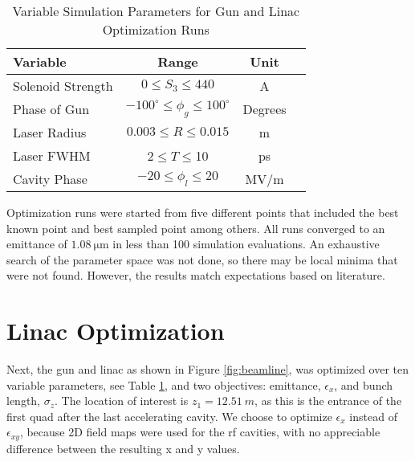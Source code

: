 \documentclass[letterpaper,  %
              ]{jacow}
\begin{document}
\begin{table}[hbt] %
	\centering
	\begin{tabular}{ l *{3}{c}}
		\textbf{Variable} & \textbf{Range} & \textbf{Unit} \\
		\hline %
		Solenoid Strength & $ 0 \le S_3 \le 440$  & A \\
		Phase of Gun & $-100^\circ \le \phi_g \le 100^\circ$  & Degrees \\
		Laser Radius & $0.003 \le R \le 0.015$  & m \\
		Laser FWHM & $2 \le T \le $10  & ps \\
		Cavity Phase & $-20 \le \phi_l \le 20$  & MV/m \\
	\end{tabular}
	\caption{Variable Simulation Parameters for Gun and Linac Optimization Runs}	
	\label{tab:parameters}
\end{table}

Optimization runs were started from five different points that 
included the best known point and best sampled point
among others. All runs converged to an emittance of 
$\SI{1.08}{\um}$ in less than 100 simulation evaluations. 
An exhaustive search of the parameter space was not done, 
so there may be local minima that were not found.
However, the results match expectations based on literature.

\section{Linac Optimization} 
Next, the gun and linac as shown in Figure \ref{fig:beamline}, 
was optimized over ten variable parameters, see Table \ref{tab:parameters}, 
and two objectives: emittance, $\epsilon_x$, and bunch length, $\sigma_z$. 
The location of interest is $z_1=\SI{12.51}{m}$, 
as this is the entrance of the first 
quad after the last accelerating cavity. 
We choose to optimize $\epsilon_x$
instead of $\epsilon_{xy}$, because 2D field maps were 
used for the rf cavities, with no appreciable 
difference between the resulting x and y values.
\end{document}
